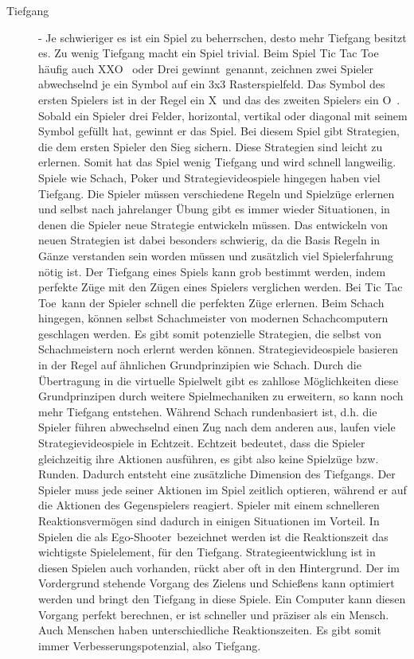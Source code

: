 \begin{description}


\item[Tiefgang] - Je schwieriger es ist ein Spiel zu beherrschen, desto mehr Tiefgang besitzt es.  Zu wenig Tiefgang macht ein Spiel trivial. Beim Spiel \glqq Tic Tac Toe\grqq\, häufig auch \glqq XXO \grqq\ oder \glqq Drei gewinnt\grqq\ genannt, zeichnen zwei Spieler abwechselnd je ein Symbol auf ein 3x3 Rasterspielfeld. Das Symbol des ersten Spielers ist in der Regel ein \glqq X\grqq\ und das des zweiten Spielers ein \glqq O\grqq\ . Sobald ein Spieler drei Felder, horizontal, vertikal oder diagonal mit seinem Symbol gefüllt hat, gewinnt er das Spiel. Bei diesem Spiel gibt Strategien, die dem ersten Spieler den Sieg sichern. Diese Strategien sind leicht zu erlernen. Somit hat das Spiel wenig Tiefgang und wird schnell langweilig. Spiele wie Schach, Poker und Strategievideospiele hingegen haben viel Tiefgang. Die Spieler müssen verschiedene Regeln und Spielzüge erlernen und selbst nach jahrelanger Übung gibt es immer wieder Situationen, in denen die Spieler neue Strategie entwickeln müssen. Das entwickeln von neuen Strategien ist dabei besonders schwierig, da die Basis Regeln in Gänze verstanden sein worden müssen und zusätzlich viel Spielerfahrung nötig ist. Der Tiefgang eines Spiels kann grob bestimmt werden, indem perfekte Züge mit den Zügen eines Spielers verglichen werden. Bei \glqq Tic Tac Toe\grqq\ kann der Spieler schnell die perfekten Züge erlernen. Beim Schach hingegen, können selbst Schachmeister von modernen Schachcomputern geschlagen werden. Es gibt somit potenzielle Strategien, die selbst von Schachmeistern noch erlernt werden können. Strategievideospiele basieren in der Regel auf ähnlichen Grundprinzipien wie Schach. Durch die Übertragung in die virtuelle Spielwelt gibt es zahllose Möglichkeiten diese Grundprinzipen durch weitere Spielmechaniken zu erweitern, so kann noch mehr Tiefgang entstehen. Während Schach rundenbasiert ist, d.h. die Spieler führen abwechselnd einen Zug nach dem anderen aus, laufen viele Strategievideospiele in Echtzeit. Echtzeit bedeutet, dass die Spieler gleichzeitig ihre Aktionen ausführen, es gibt also keine Spielzüge bzw. Runden. Dadurch entsteht eine zusätzliche Dimension des Tiefgangs. Der Spieler muss jede seiner Aktionen im Spiel zeitlich optieren, während er auf die Aktionen des Gegenspielers reagiert. Spieler mit einem schnelleren Reaktionsvermögen sind dadurch in einigen Situationen im Vorteil. In Spielen die als \glqq Ego-Shooter\grqq\ bezeichnet werden ist die Reaktionszeit das wichtigste Spielelement, für den Tiefgang. Strategieentwicklung ist in diesen Spielen auch vorhanden, rückt aber oft in den Hintergrund. Der im Vordergrund stehende Vorgang des Zielens und Schießens kann optimiert werden und bringt den Tiefgang in diese Spiele. Ein Computer kann diesen Vorgang perfekt berechnen, er ist schneller und präziser als ein Mensch. Auch Menschen haben unterschiedliche Reaktionszeiten. Es gibt somit immer Verbesserungspotenzial, also Tiefgang. \cite[S. 63 ff.]{Adams:1515529}   
    

\end{description}
